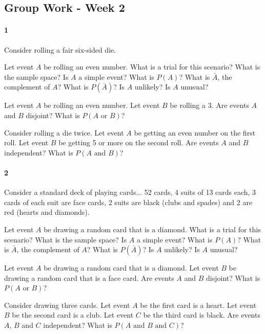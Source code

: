 \documentclass{article}
\begin{document}
\begin{flushleft}
\section*{Group Work - Week 2}
\paragraph{1} Consider rolling a fair six-sided die.
\begin{enumalpha}
\item Let event $A$ be rolling an even number. What is a trial for this scenario? What is the sample space? Is $A$ a simple event? What is $P(A)$? What is $\bar A$, the complement of $A$? What is $P(\bar A)$? Is $A$ unlikely? Is $A$ unusual?
\vspace{2.5in}
\item Let event $A$ be rolling an even number. Let event $B$ be rolling a 3. Are events $A$ and $B$ disjoint? What is $P(A \text{ or } B)$?
\vspace{2.5in}
\item Consider rolling a die twice. Let event $A$ be getting an even number on the first roll. Let event $B$ be getting 5 or more on the second roll. Are events $A$ and $B$ independent? What is $P(A \text { and } B)$?
\end{enumalpha}

\newpage
\paragraph{2} Consider a standard deck of playing cards... 52 cards, 4 suits of 13 cards each, 3 cards of each suit are face cards, 2 suits are black (clubs and spades) and 2 are red (hearts and diamonds).
\begin{enumalpha}
\item Let event $A$ be drawing a random card that is a diamond. What is a trial for this scenario? What is the sample space? Is $A$ a simple event? What is $P(A)$? What is $\bar A$, the complement of $A$? What is $P(\bar A)$? Is $A$ unlikely? Is $A$ unusual?
\vspace{2.5in}
\item Let event $A$ be drawing a random card that is a diamond. Let event $B$ be drawing a random card that is a face card. Are events $A$ and $B$ disjoint? What is $P(A \text{ or } B)$?
\vspace{2.5in}
\item Consider drawing three cards. Let event $A$ be the first card is a heart. Let event $B$ be the second card is a club. Let event $C$ be the third card is black. Are events $A$, $B$ and $C$ independent? What is $P(A \text { and } B \text { and } C)$?


\end{enumalpha}
\end{flushleft}
\end{document}
